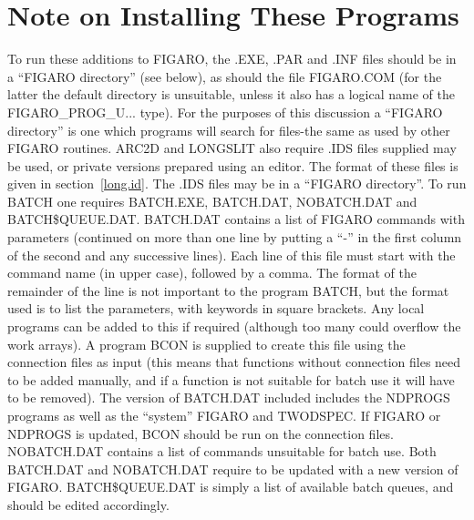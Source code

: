 \appendix

\section{Note on Installing These Programs}
\label{append.install}

To run these additions to FIGARO, the .EXE, .PAR and .INF files should
be in a ``FIGARO directory'' (see below), as should the file FIGARO.COM
(for the latter the default directory is unsuitable, unless it also has
a logical name of the FIGARO\_PROG\_U... type).
For the purposes of this discussion a ``FIGARO directory'' is one which
programs will search for files-the same as used by other FIGARO
routines.
ARC2D and LONGSLIT also require .IDS files supplied may be used, or
private versions prepared using an editor.
The format of these files is given in section~\ref{long.id}.
The .IDS files may be in a ``FIGARO directory''.
To run BATCH one requires BATCH.EXE, BATCH.DAT, NOBATCH.DAT and
BATCH\$QUEUE.DAT. BATCH.DAT contains a list of FIGARO commands with
parameters (continued on more than one line by putting a ``-'' in the
first column of the second and any successive lines).
Each line of this file must start with the command name (in upper case),
followed by a comma.
The format of the remainder of the line is not important to the program
BATCH, but the format used is to list the parameters, with keywords in
square brackets.
Any local programs can be added to this if required (although too many
could overflow the work arrays).
A program BCON is supplied to create this file using the connection
files as input (this means that functions without connection files need
to be added manually, and if a function is not suitable for batch use it
will have to be removed).
The version of BATCH.DAT included includes the NDPROGS programs as well
as the ``system'' FIGARO and TWODSPEC.
If FIGARO or NDPROGS is updated, BCON should be run on the connection
files.
NOBATCH.DAT contains a list of commands unsuitable for batch use.
Both BATCH.DAT and NOBATCH.DAT require to be updated with a new version
of FIGARO.
BATCH\$QUEUE.DAT is simply a list of available batch queues, and should
be edited accordingly.

